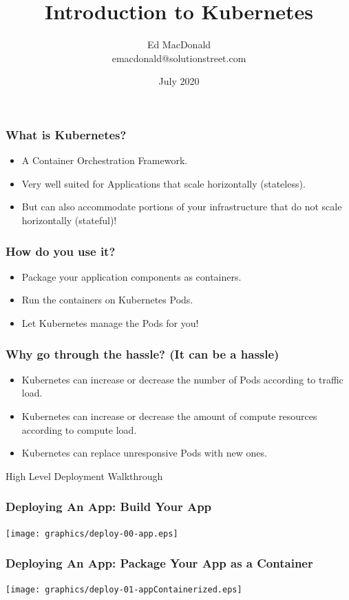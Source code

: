 \documentclass{beamer}
\title[Kubernetes]{Introduction to Kubernetes}
\author[Ed MacDonald]{Ed MacDonald\\emacdonald@solutionstreet.com}
\institute[\href{https://solutionstreet.com}{SolutionStreet}]{SolutionStreet\\\href{https://solutionstreet.com}{(solutionstreet.com)}}
\date{July 2020}
\begin{document}
\frame{\titlepage}

\begin{frame}
\frametitle{What is Kubernetes?}
\begin{itemize}
    \item{A Container Orchestration Framework.}
    \item{Very well suited for Applications that scale horizontally (stateless).}
    \item{But can also accommodate portions of your infrastructure that do not scale horizontally (stateful)!}
\end{itemize}
\end{frame}

\begin{frame}
    \frametitle{How do you use it?}
    \begin{itemize}
        \item{Package your application components as containers.}
        \item{Run the containers on Kubernetes Pods.}
        \item{Let Kubernetes manage the Pods for you!}
    \end{itemize}
\end{frame}

\begin{frame}
    \frametitle{Why go through the hassle? (It can be a hassle)}
    \begin{itemize}
        \item{Kubernetes can increase or decrease the number of Pods according to traffic load.}
        \item{Kubernetes can increase or decrease the amount of compute resources according to compute load.}
        \item{Kubernetes can replace unresponsive Pods with new ones.}
    \end{itemize}
\end{frame}

\begin{frame}
    \begin{center}
        \Huge High Level Deployment Walkthrough
    \end{center}
\end{frame}

\begin{frame}
    \frametitle{Deploying An App: Build Your App}
    \texttt{[image: graphics/deploy-00-app.eps]}
\end{frame}

\begin{frame}
    \frametitle{Deploying An App: Package Your App as a Container}
    \texttt{[image: graphics/deploy-01-appContainerized.eps]}
\end{frame}
\end{document}
